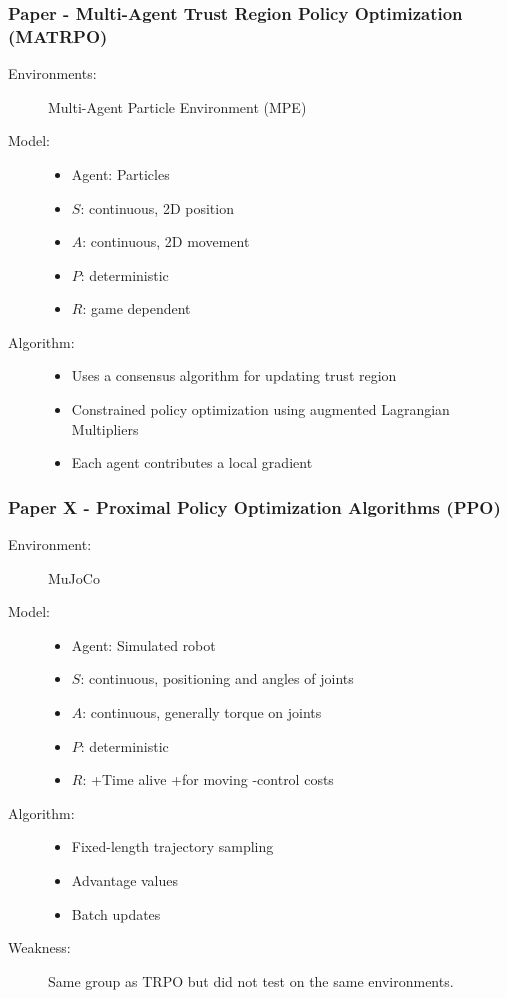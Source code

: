 \documentclass{beamer}
\begin{document}
\begin{frame} %
    \frametitle{Paper \thepapercounter - Multi-Agent Trust Region Policy Optimization (MATRPO)%
    }
    \begin{description} 
        \item[Environments:] Multi-Agent Particle Environment (MPE)
        \item[Model:]
        \begin{itemize}
            \item Agent: Particles
            \item $S$: continuous, 2D position
            \item $A$: continuous, 2D movement
            \item $P$: deterministic
            \item $R$: game dependent
        \end{itemize}
        \item[Algorithm:]
        \begin{itemize}
            \item Uses a consensus algorithm for updating trust region
            \item Constrained policy optimization using augmented Lagrangian Multipliers
            \item Each agent contributes a local gradient
        \end{itemize}
    \end{description}
\end{frame}

\begin{frame} %
    \frametitle{Paper X - Proximal Policy Optimization Algorithms (PPO)%
    }
    \begin{description}
        \item[Environment:] MuJoCo 
        \item[Model:]
        \begin{itemize}
            \item Agent: Simulated robot
            \item $S$: continuous, positioning and angles of joints
            \item $A$: continuous, generally torque on joints
            \item $P$: deterministic
            \item $R$: +Time alive +for moving -control costs
        \end{itemize}
        \item[Algorithm:] 
        \begin{itemize}
            \item Fixed-length trajectory sampling
            \item Advantage values
            \item Batch updates
        \end{itemize}
        \item[Weakness:] Same group as TRPO but did not test on the same environments.
    \end{description}
\end{frame}
\end{document}
